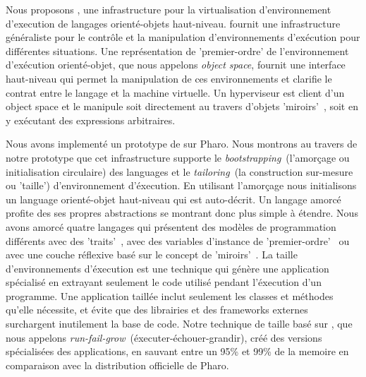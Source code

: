 \documentclass[a4paper,11pt,twoside]{include/ThesisStyle}
\begin{document}
Nous proposons \Vtt, une infrastructure pour la virtualisation d'environnement d'execution de langages orienté-objets haut-niveau. \Vtt fournit une infrastructure généraliste pour le contrôle et la manipulation d'environnements d'exécution pour différentes situations. Une représentation de 'premier-ordre' de l'environnement d'exécution orienté-objet, que nous appelons \emph{object space}, fournit une interface haut-niveau qui permet la manipulation de ces environnements et clarifie le contrat entre le langage et la machine virtuelle. Un hyperviseur est client d'un object space et le manipule soit directement au travers d'objets 'miroirs'~\cite{Brac04b}, soit en y exécutant des expressions arbitraires.

Nous avons implementé un prototype de \Vtt sur Pharo. Nous montrons au travers de notre prototype que cet infrastructure supporte le \emph{bootstrapping}~(\ie l'amorçage ou initialisation circulaire) des languages et le \emph{tailoring}~(\ie la construction sur-mesure ou 'taille') d'environnement d'éxecution. En utilisant l'amorçage nous initialisons un language orienté-objet haut-niveau qui est auto-décrit. Un langage amorcé profite des ses propres abstractions se montrant donc plus simple à étendre. Nous avons amorcé quatre langages qui présentent des modèles de programmation différents \eg avec des 'traits'~\cite{Scha03a}, avec des variables d'instance de 'premier-ordre'~\cite{Verw11a} ou avec une couche réflexive basé sur le concept de 'miroirs'~\cite{Brac04b}. La taille d'environnements d'éxecution est une technique qui génère une application spécialisé en extrayant seulement le code utilisé pendant l'éxecution d'un programme. Une application taillée inclut seulement les classes et méthodes qu'elle nécessite, et évite que des librairies et des frameworks externes surchargent inutilement la base de code. Notre technique de taille basé sur \Vtt, que nous appelons \emph{run-fail-grow}~(\ie éxecuter-échouer-grandir), créé des versions spécialisées des applications, en sauvant entre un 95\% et 99\% de la memoire en comparaison avec la distribution officielle de Pharo.

\renewcommand{\baselinestretch}{1}\normalsize
\tableofcontents

\renewcommand{\baselinestretch}{1.2}\normalsize
\mainmatter
{}
\end{document}

